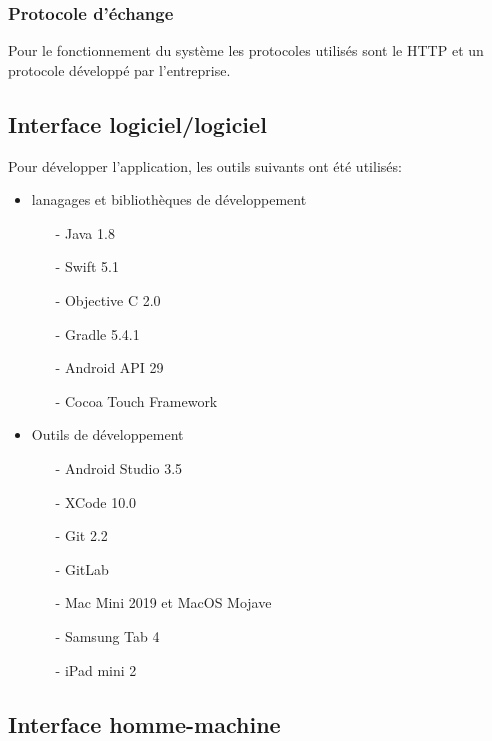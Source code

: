 \subsubsection*{Protocole d'échange}
Pour le fonctionnement du système les protocoles utilisés sont le \gls{HTTP} et un protocole développé par l'entreprise.

\subsection{Interface logiciel/logiciel}
Pour développer l'application, les outils suivants ont été utilisés:
\begin{itemize}
	\item lanagages et bibliothèques de développement 
	\begin{itemize}
		\item[-] \gls{Java} 1.8
		\item[-] Swift\cite{swift} 5.1
		\item[-] \gls{Objective C} 2.0
		\item[-] \gls{Gradle} 5.4.1
		\item[-] \gls{Android} API 29
		\item[-] \gls{Cocoa} Touch Framework 
	\end{itemize}
	\item Outils de développement
	\begin{itemize}
		\item[-] Android Studio 3.5
		\item[-] XCode 10.0
		\item[-] \gls{Git} 2.2
		\item[-] GitLab
		\item[-] Mac Mini 2019 et MacOS Mojave
		\item[-] Samsung Tab 4
		\item[-] iPad mini 2
	\end{itemize}
\end{itemize}

\subsection{Interface homme-machine}
